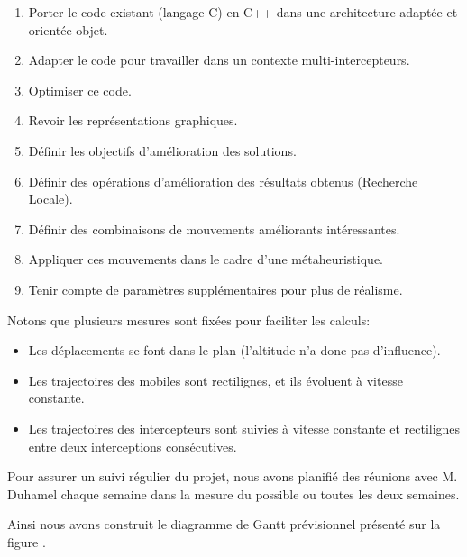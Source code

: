     	\begin{enumerate}
    		\item Porter le code existant (langage C) en C++ dans une architecture adaptée et orientée objet.
    		\item Adapter le code pour travailler dans un contexte multi-intercepteurs.
    		\item Optimiser ce code.
    		\item Revoir les représentations graphiques.
    		\item Définir les objectifs d'amélioration des solutions.
    		\item Définir des opérations d'amélioration des résultats obtenus (Recherche Locale).
    		\item Définir des combinaisons de mouvements améliorants intéressantes.
    		\item Appliquer ces mouvements dans le cadre d'une métaheuristique.
    		\item Tenir compte de paramètres supplémentaires pour plus de réalisme.
    	\end{enumerate}

    	Notons que plusieurs mesures sont fixées pour faciliter les calculs:
    	\begin{itemize}
    		\item Les déplacements se font dans le plan (l'altitude n'a donc pas d'influence).
    		\item Les trajectoires des mobiles sont rectilignes, et ils évoluent à vitesse constante.
    		\item Les trajectoires des intercepteurs sont suivies à vitesse constante et rectilignes entre deux interceptions consécutives.
    	\end{itemize}

    	Pour assurer un suivi régulier du projet, nous avons planifié des réunions avec M. Duhamel chaque semaine dans la mesure du possible ou toutes les deux semaines.

    	Ainsi nous avons construit le diagramme de Gantt prévisionnel présenté sur la figure .
